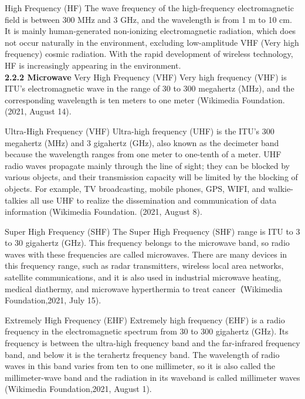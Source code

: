 \documentclass[conference]{IEEEtran}
\begin{document}
High Frequency (HF)
The wave frequency of the high-frequency electromagnetic field is between 300 MHz and 3 GHz, and the wavelength is from 1 m to 10 cm. It is mainly human-generated non-ionizing electromagnetic radiation, which does not occur naturally in the environment, excluding low-amplitude VHF (Very high frequency) cosmic radiation. With the rapid development of wireless technology, HF is increasingly appearing in the environment.
\\
{\bf 2.2.2	Microwave\rm}
Very High Frequency (VHF)
Very high frequency (VHF) is ITU's electromagnetic wave in the range of 30 to 300 megahertz (MHz), and the corresponding wavelength is ten meters to one meter (Wikimedia Foundation. (2021, August 14).

Ultra-High Frequency (VHF)
Ultra-high frequency (UHF) is the ITU's 300 megahertz (MHz) and 3 gigahertz (GHz), also known as the decimeter band because the wavelength ranges from one meter to one-tenth of a meter. UHF radio waves propagate mainly through the line of sight; they can be blocked by various objects, and their transmission capacity will be limited by the blocking of objects. For example, TV broadcasting, mobile phones, GPS, WIFI, and walkie-talkies all use UHF to realize the dissemination and communication of data information (Wikimedia Foundation. (2021, August 8).

Super High Frequency (SHF)
The Super High Frequency (SHF) range is ITU to 3 to 30 gigahertz (GHz). This frequency belongs to the microwave band, so radio waves with these frequencies are called microwaves. There are many devices in this frequency range, such as radar transmitters, wireless local area networks, satellite communications, and it is also used in industrial microwave heating, medical diathermy, and microwave hyperthermia to treat cancer（Wikimedia Foundation,2021, July 15).

Extremely High Frequency (EHF)
Extremely high frequency (EHF) is a radio frequency in the electromagnetic spectrum from 30 to 300 gigahertz (GHz). Its frequency is between the ultra-high frequency band and the far-infrared frequency band, and below it is the terahertz frequency band. The wavelength of radio waves in this band varies from ten to one millimeter, so it is also called the millimeter-wave band and the radiation in its waveband is called millimeter waves (Wikimedia Foundation,2021, August 1).
\end{document}
